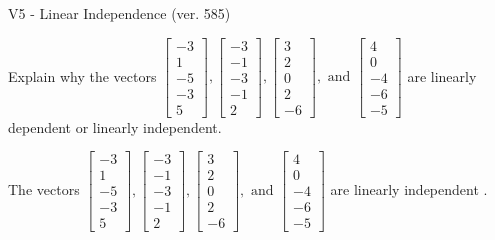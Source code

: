\begin{exercise}
  \begin{exerciseTitle}V5 - Linear Independence (ver. 585)\end{exerciseTitle}
  \begin{exerciseStatement}
    Explain why the vectors \(\left[\begin{array}{r}
-3 \\
1 \\
-5 \\
-3 \\
5
\end{array}\right] , \left[\begin{array}{r}
-3 \\
-1 \\
-3 \\
-1 \\
2
\end{array}\right] , \left[\begin{array}{r}
3 \\
2 \\
0 \\
2 \\
-6
\end{array}\right] , \text{ and } \left[\begin{array}{r}
4 \\
0 \\
-4 \\
-6 \\
-5
\end{array}\right]\) are linearly dependent or linearly independent.	


  \end{exerciseStatement}
  \begin{exerciseAnswer}
   The vectors \(\left[\begin{array}{r}
-3 \\
1 \\
-5 \\
-3 \\
5
\end{array}\right] , \left[\begin{array}{r}
-3 \\
-1 \\
-3 \\
-1 \\
2
\end{array}\right] , \left[\begin{array}{r}
3 \\
2 \\
0 \\
2 \\
-6
\end{array}\right] , \text{ and } \left[\begin{array}{r}
4 \\
0 \\
-4 \\
-6 \\
-5
\end{array}\right]\) are 
  	 linearly independent  .
  


  \end{exerciseAnswer}
\end{exercise}